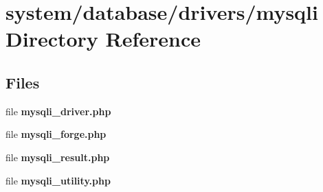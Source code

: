\section{system/database/drivers/mysqli Directory Reference}
\label{dir_af86efcb20a3346723b6915f61b9f076}
\subsection*{Files}
\begin{DoxyCompactItemize}
\item 
file {\bf mysqli\-\_\-driver.\-php}
\item 
file {\bf mysqli\-\_\-forge.\-php}
\item 
file {\bf mysqli\-\_\-result.\-php}
\item 
file {\bf mysqli\-\_\-utility.\-php}
\end{DoxyCompactItemize}
